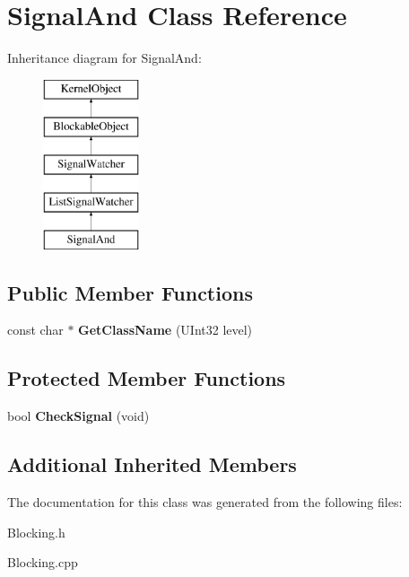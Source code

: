 \hypertarget{class_signal_and}{}\section{Signal\+And Class Reference}
\label{class_signal_and}
Inheritance diagram for Signal\+And\+:\begin{figure}[H]
\begin{center}
\leavevmode
\includegraphics[height=5.000000cm]{class_signal_and}
\end{center}
\end{figure}
\subsection*{Public Member Functions}
\begin{DoxyCompactItemize}
\item 
\mbox{\label{class_signal_and_ad51f3d5bad57164ca70454a070c86d1f}} 
const char $\ast$ {\bfseries Get\+Class\+Name} (U\+Int32 level)
\end{DoxyCompactItemize}
\subsection*{Protected Member Functions}
\begin{DoxyCompactItemize}
\item 
\mbox{\label{class_signal_and_a2b3f51fd16fb5647fb7387b3194c0c7f}} 
bool {\bfseries Check\+Signal} (void)
\end{DoxyCompactItemize}
\subsection*{Additional Inherited Members}


The documentation for this class was generated from the following files\+:\begin{DoxyCompactItemize}
\item 
Blocking.\+h\item 
Blocking.\+cpp\end{DoxyCompactItemize}
